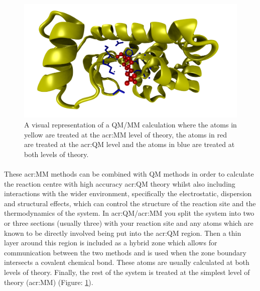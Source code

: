 \begin{figure}[H]
    \centering
    \includegraphics[width=\textwidth]{Graphics/Theory/QMMM.png}
    \caption{A visual representation of a QM/MM calculation where the atoms in yellow are treated at the \gls{acr:MM} level of theory, the atoms in red are treated at the \gls{acr:QM} level and the atoms in blue are treated at both levels of theory.}
    \label{fig:QMMM}
\end{figure}

\paragraph{}
These \gls{acr:MM} methods can be combined with QM methods in order to calculate the reaction centre with high accuracy \gls{acr:QM} theory whilst also including interactions with the wider environment, specifically the electrostatic, dispersion and structural effects, which can control the structure of the reaction site and the thermodynamics of the system. In \gls{acr:QM}/\gls{acr:MM} you split the system into two or three sections (usually three) with your reaction site and any atoms which are known to be directly involved being put into the \gls{acr:QM} region. Then a thin layer around this region is included  as a hybrid zone which allows for communication between the two methods and is used when the zone boundary intersects a covalent chemical bond. These atoms are usually calculated at both levels of theory. Finally, the rest of the system is treated at the simplest level of theory (\gls{acr:MM}) (Figure: \ref{fig:QMMM}).